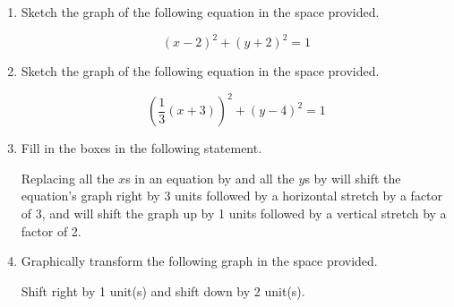 \documentclass{article}
\begin{document}
\ActivityTitle[class={College Algebra}, number={2}, name={Transformations}]

\begin{enumerate}
\item Sketch the graph of the following equation in the space provided.

\[ (x - 2)^2 + (y + 2)^2 = 1 \]

\begin{center}
\CartesianPlane[axes=yes, h=7, w=7]
\end{center} \vspace{1cm}

\item Sketch the graph of the following equation in the space provided.

\[ \left(\frac{1}{3}(x + 3)\right)^2 + (y - 4)^2 = 1 \]

\begin{center}
\CartesianPlane[axes=yes, h=7, w=7]
\end{center} \vspace{1cm}

\newpage

\item Fill in the boxes in the following statement.

Replacing all the $x$s in an equation by \framebox{\begin{minipage}{3cm} \hfill\vspace{1cm} \end{minipage}} and all the $y$s by \framebox{\begin{minipage}{3cm} \hfill\vspace{1cm} \end{minipage}} will shift the equation's graph right by 3 units followed by a horizontal stretch by a factor of 3, and will shift the graph up by 1 units followed by a vertical stretch by a factor of 2.

   \vspace{3cm}

\item Graphically transform the following graph in the space provided.

\begin{center}
Shift right by 1 unit(s) and shift down by 2 unit(s).
\end{center}

\begin{center}
\MiniGraph[gadget=hellipse]
\end{center}


\end{enumerate}
\end{document}
